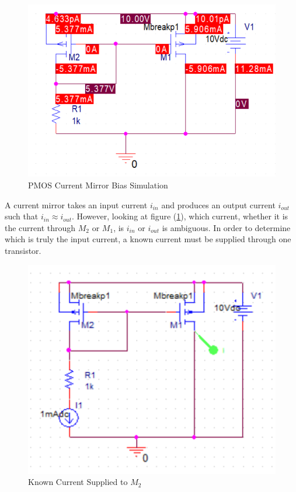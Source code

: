 \FloatBarrier

\begin{figure}[h!]
	\centering
	\includegraphics[scale=0.75]{./images/circuit1_bp.PNG}
	\caption{PMOS Current Mirror Bias Simulation}
	\label{fig:circuit1_bp}
\end{figure}

\FloatBarrier

A current mirror takes an input current $i_{in}$ and produces an output current $i_{out}$ such that $i_{in} \approx i_{out}$.
However, looking at figure (\ref{fig:circuit1_bp}), which current, whether it is the current through $M_2$ or $M_1$, is $i_{in}$ or $i_{out}$ is ambiguous.
In order to determine which is truly the input current, a known current must be supplied through one transistor.

\FloatBarrier

\begin{figure}[h!]
	\centering
	\includegraphics[scale=0.75]{./images/thought_exp1.PNG}
	\caption{Known Current Supplied to $M_2$}
	\label{fig:thought_exp1}
\end{figure}

